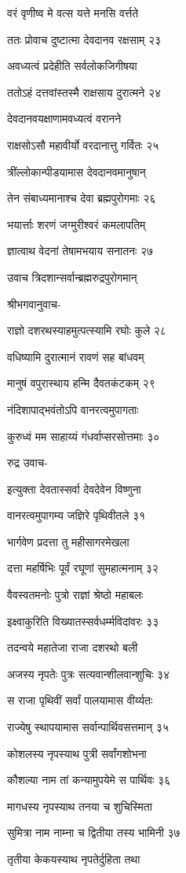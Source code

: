 वरं वृणीष्व मे वत्स यत्ते मनसि वर्त्तते

ततः प्रोवाच दुष्टात्मा देवदानव रक्षसाम् २३

अवध्यत्वं प्रदेहीति सर्वलोकजिगीषया

ततोऽहं दत्तवांस्तस्मै राक्षसाय दुरात्मने २४

देवदानवयक्षाणामवध्यत्वं वरानने

राक्षसोऽसौ महावीर्यो वरदानात्तु गर्वितः २५

त्रींल्लोकान्पीडयामास देवदानवमानुषान्

तेन संबाध्यमानाश्च देवा ब्रह्मपुरोगमाः २६

भयार्त्ताः शरणं जग्मुरीश्वरं कमलापतिम्

ज्ञात्वाथ वेदनां तेषामभयाय सनातनः २७

उवाच त्रिदशान्सर्वान्ब्रह्मरुद्रपुरोगमान्

श्रीभगवानुवाच-

राज्ञो दशरथस्याहमुत्पत्स्यामि रघोः कुले २८

वधिष्यामि दुरात्मानं रावणं सह बांधवम्

मानुषं वपुरास्थाय हन्मि दैवतकंटकम् २९

नंदिशापाद्भवंतोऽपि वानरत्वमुपागताः

कुरुध्वं मम साहाय्यं गंधर्वाप्सरसोत्तमाः ३०

रुद्र उवाच-

इत्युक्ता देवतास्सर्वा देवदेवेन विष्णुना

वानरत्वमुपागम्य जज्ञिरे पृथिवीतले ३१

भार्गवेण प्रदत्ता तु महीसागरमेखला

दत्ता महर्षिभिः पूर्वं रघूणां सुमहात्मनाम् ३२

वैवस्वतमनोः पुत्रो राज्ञां श्रेष्ठो महाबलः

इक्ष्वाकुरिति विख्यातस्सर्वधर्म्मविदांवरः ३३

तदन्वये महातेजा राजा दशरथो बली

अजस्य नृपतेः पुत्रः सत्यवान्शीलवान्शुचिः ३४

स राजा पृथिवीं सर्वां पालयामास वीर्य्यतः

राज्येषु स्थापयामास सर्वान्पार्थिवसत्तमान् ३५

कोशलस्य नृपस्याथ पुत्री सर्वांगशोभना

कौशल्या नाम तां कन्यामुपयेमे स पार्थिवः ३६

मागधस्य नृपस्याथ तनया च शुचिस्मिता

सुमित्रा नाम नाम्ना च द्वितीया तस्य भामिनी ३७

तृतीया केकयस्याथ नृपतेर्दुहिता तथा

